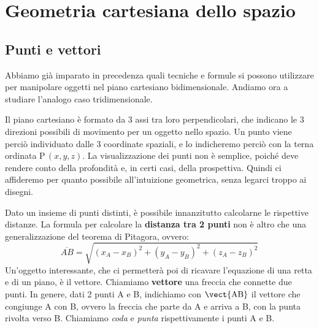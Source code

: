 
\newcommand{\vettcol}[3]{\begin{pmatrix}
#1\\ #2\\ #3
\end{pmatrix}}


\chapter{Geometria cartesiana dello spazio}

\section{Punti e vettori}
\label{sec:Punti_e_vettori}

Abbiamo già imparato in precedenza quali tecniche e formule si possono utilizzare per manipolare oggetti nel piano cartesiano bidimensionale. Andiamo ora a studiare l'analogo caso tridimensionale. 

\vspace{7pt}

Il piano cartesiano è formato da 3 assi tra loro perpendicolari, che indicano le 3 direzioni possibili di movimento per un oggetto nello spazio. Un punto viene perciò individuato dalle 3 coordinate spaziali, e lo indicheremo perciò con la terna ordinata P\,$(x,y,z)$. La visualizzazione dei punti non è semplice, poiché deve rendere conto della profondità e, in certi casi, della prospettiva. Quindi ci affideremo per quanto possibile all'intuizione geometrica, senza legarci troppo ai disegni.

\vspace{7pt}

Dato un insieme di punti distinti, è possibile innanzitutto calcolarne le rispettive distanze. La formula per calcolare la \textbf{distanza tra 2 punti} non è altro che una generalizzazione del teorema di Pitagora, ovvero:
\[\overline{AB} = \sqrt{(x_A-x_B)^2+(y_A-y_B)^2+(z_A-z_B)^2}\]
Un'oggetto interessante, che ci permetterà poi di ricavare l'equazione di una retta e di un piano, è il vettore. Chiamiamo \textbf{vettore} una freccia che connette due punti. In genere, dati 2 punti A e B, indichiamo con $\vect{\text{AB}}$ il vettore che congiunge A con B, ovvero la freccia che parte da A e arriva a B, con la punta rivolta verso B. Chiamiamo \emph{coda} e \emph{punta} rispettivamente i punti A e B. 

\vspace{7pt}

